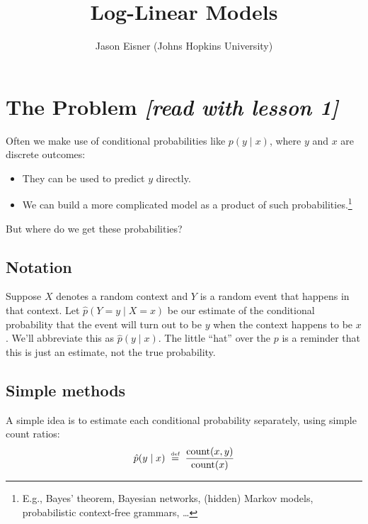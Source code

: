 \documentclass[11pt]{article}
\newcommand{\defeq}{\;\stackrel{\mbox{\tiny def}}{=}\;}
\newcommand{\ph}{\hat{p}}
\begin{document}
\title{Log-Linear Models}
\author{Jason Eisner (Johns Hopkins University)}
\date{}
\maketitle

\begin{center}
\end{center}

\section{The Problem {\em [read with lesson 1]}}

Often we make use of conditional probabilities like $p(y \mid x)$, where
$y$ and $x$ are discrete outcomes:
\begin{itemize}[noitemsep]
\item They can be used to predict $y$ directly.
\item We can build a more complicated model as a product
  of such probabilities.\footnote{E.g., Bayes' theorem, Bayesian
    networks, (hidden) Markov models, probabilistic context-free
    grammars, \ldots}
\end{itemize}
But where do we get these probabilities?

\subsection{Notation}

Suppose $X$ denotes a random context and $Y$ is a random event that
happens in that context.  Let $\ph(Y=y \mid X=x)$ be our estimate of
the conditional probability that the event will turn out to be $y$ when
the context happens to be $x$.  We'll abbreviate this as
$\ph(y\mid x)$.  The little ``hat'' over the $p$ is a reminder that
this is just an estimate, not the true probability.

\subsection{Simple methods}\label{sec:mle}

A simple idea is to estimate each conditional probability separately,
using simple count ratios: 
\begin{equation}
\ph(y \mid x) \defeq \frac{\textrm{count}(x,y)}{\textrm{count}(x)}
\end{equation}
\end{document}

